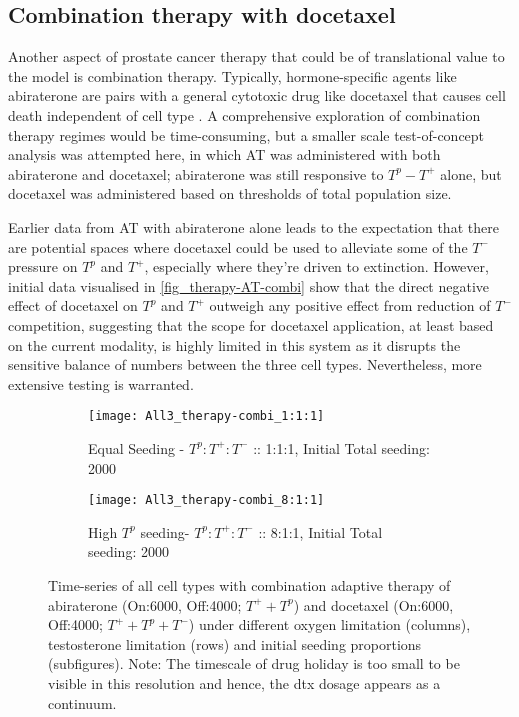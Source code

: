 \clearpage

\subsection{Combination therapy with docetaxel}
Another aspect of prostate cancer therapy that could be of translational value to the model is combination therapy. Typically, hormone-specific agents like abiraterone are pairs with a general cytotoxic drug like docetaxel that causes cell death independent of cell type \cite{West}. A comprehensive exploration of combination therapy regimes would be time-consuming, but a smaller scale test-of-concept analysis was attempted here, in which AT was administered with both abiraterone and docetaxel; abiraterone was still responsive to $T^p - T^+$ alone, but docetaxel was administered based on thresholds of total population size.

Earlier data from AT with abiraterone alone leads to the expectation that there are potential spaces where docetaxel could be used to alleviate some of the $T^-$ pressure on $T^p$ and $T^+$, especially where they’re driven to extinction. However, initial data visualised in \autoref{fig_therapy-AT-combi} show that the direct negative effect of docetaxel on $T^p$ and $T^+$ outweigh any positive effect from reduction of $T^-$ competition, suggesting that the scope for docetaxel application, at least based on the current modality, is highly limited in this system as it disrupts the sensitive balance of numbers between the three cell types. Nevertheless, more extensive testing is warranted.

\begin{figure}[h!]
  \centering
  \begin{subfigure}[b]{\textwidth}
    \centering
    \texttt{[image: All3\_therapy-combi\_1:1:1]}
    \caption{Equal Seeding - $T^p:T^+:T^-$ :: 1:1:1, Initial Total seeding: 2000}
    \label{fig_therapy-AT-combi_1:1:1-2000}
  \end{subfigure}
  \begin{subfigure}[b]{\textwidth}
    \centering
    \texttt{[image: All3\_therapy-combi\_8:1:1]}
    \caption{High $T^p$ seeding- $T^p:T^+:T^-$ :: 8:1:1, Initial Total seeding: 2000}
    \label{fig_therapy-AT_combi_8:1:1-2000}
  \end{subfigure}
  \caption[Time-series of all cell types with combination adaptive therapy]{Time-series of all cell types with combination adaptive therapy of abiraterone (On:6000, Off:4000; $T^+ + T^p$) and docetaxel (On:6000, Off:4000; $T^+ + T^p + T^-$) under different oxygen limitation (columns), testosterone limitation (rows) and initial seeding proportions (subfigures). Note: The timescale of drug holiday is too small to be visible in this resolution and hence, the dtx dosage appears as a continuum.}
  \label{fig_therapy-AT-combi}
\end{figure}
